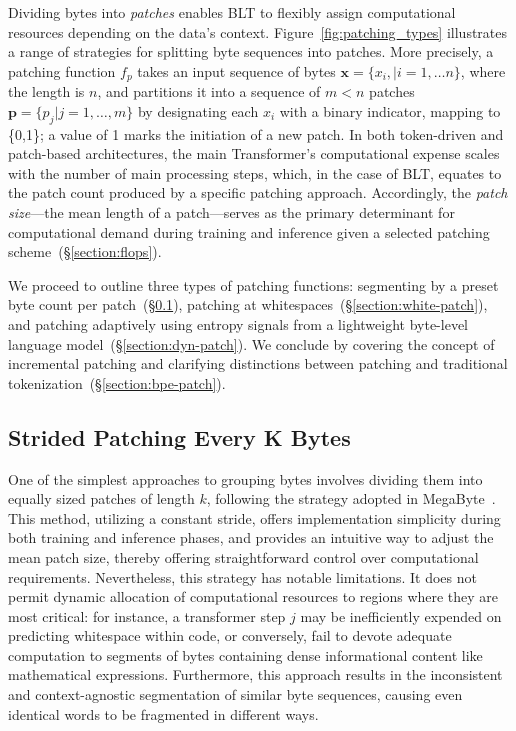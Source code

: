 Dividing bytes into \textit{patches} enables {\textsc BLT} to flexibly assign computational resources depending on the data's context. Figure~\ref{fig:patching_types} illustrates a range of strategies for splitting byte sequences into patches. More precisely, a patching function $f_p$ takes an input sequence of bytes $\pmb{x}=\{x_i,|i=1,\ldots n\}$, where the length is $n$, and partitions it into a sequence of $m < n$ patches $\pmb{p}=\{p_j|j=1,\ldots,m\}$ by designating each $x_i$ with a binary indicator, mapping to \{0,1\}; a value of 1 marks the initiation of a new patch. In both token-driven and patch-based architectures, the main Transformer’s computational expense scales with the number of main processing steps, which, in the case of {\textsc BLT}, equates to the patch count produced by a specific patching approach. Accordingly, the \textit{patch size}—the mean length of a patch—serves as the primary determinant for computational demand during training and inference given a selected patching scheme~(\S\ref{section:flops}).

We proceed to outline three types of patching functions: segmenting by a preset byte count per patch~(\S\ref{section:static-patch}), patching at whitespaces~(\S\ref{section:white-patch}), and patching adaptively using entropy signals from a lightweight byte-level language model~(\S\ref{section:dyn-patch}). We conclude by covering the concept of incremental patching and clarifying distinctions between patching and traditional tokenization~(\S\ref{section:bpe-patch}).

\subsection{Strided Patching Every K Bytes}
\label{section:static-patch}

One of the simplest approaches to grouping bytes involves dividing them into equally sized patches of length $k$, following the strategy adopted in MegaByte~\citep{yu2023megabyte}. This method, utilizing a constant stride, offers implementation simplicity during both training and inference phases, and provides an intuitive way to adjust the mean patch size, thereby offering straightforward control over computational requirements. Nevertheless, this strategy has notable limitations. It does not permit dynamic allocation of computational resources to regions where they are most critical: for instance, a transformer step $j$ may be inefficiently expended on predicting whitespace within code, or conversely, fail to devote adequate computation to segments of bytes containing dense informational content like mathematical expressions. Furthermore, this approach results in the inconsistent and context-agnostic segmentation of similar byte sequences, causing even identical words to be fragmented in different ways.

